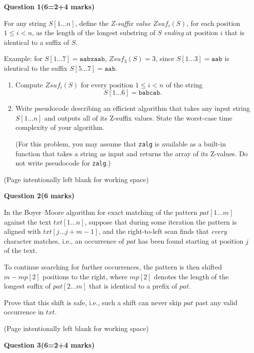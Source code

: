 \documentclass[12pt,letterpaper]{article}
\newcommand{\marksbox}[1]{%
  \vfill
  \begin{flushright}
    \fbox{\parbox[c][1.1cm][c]{1.3cm}{\centering #1}}
  \end{flushright}
}
\newcommand{\questiontitle}[2]{%
  \textbf{Question #1}\hfill\textbf{(#2 marks)}
}
\newcommand{\workingpage}{%
  \newpage
  \begin{center}
    (Page intentionally left blank for working space)
  \end{center}
}
\begin{document}
\newpage

\questiontitle{1}{6=2+4}

For any string $S[1 \ldots n]$, define the \emph{Z-suffix value}
$Zsuf_i(S)$, for each position $1 \leq i < n$, as the length of the longest
substring of $S$ \emph{ending} at position $i$ that is identical to a suffix
of $S$.

Example: for $S[1 \ldots 7] = \texttt{aabxaab}$, $Zsuf_3(S) = 3$, since
$S[1 \ldots 3] = \texttt{aab}$ is identical to the suffix
$S[5 \ldots 7] = \texttt{aab}$.

\begin{enumerate}
  \item[(i)] Compute $Zsuf_i(S)$ for every position $1 \leq i < n$ of the
  string
  \[
    S[1 \ldots 6] = \texttt{babcab}.
  \]

  \item[(ii)] Write pseudocode describing an efficient algorithm that takes
  any input string $S[1 \ldots n]$ and outputs all of its Z-suffix values.
  State the worst-case time complexity of your algorithm.

  (For this problem, you may assume that \texttt{zalg} is available as a
  built-in function that takes a string as input and returns the array of its
  Z-values. Do not write pseudocode for \texttt{zalg}.)
\end{enumerate}

\marksbox{6}

\workingpage
\newpage

\questiontitle{2}{6}

In the Boyer--Moore algorithm for exact matching of the pattern
$pat[1 \ldots m]$ against the text $txt[1 \ldots n]$, suppose that during some
iteration the pattern is aligned with $txt[j \ldots j+m-1]$, and the
right-to-left scan finds that \emph{every} character matches, i.e., an
occurrence of $pat$ has been found starting at position $j$ of the text.

To continue searching for further occurrences, the pattern is then shifted
$m - mp[2]$ positions to the right, where $mp[2]$ denotes the length of the
longest suffix of $pat[2 \ldots m]$ that is identical to a prefix of $pat$.

Prove that this shift is safe, i.e., such a shift can never skip $pat$ past
any valid occurrence in $txt$.

\marksbox{6}

\workingpage
\newpage

\questiontitle{3}{6=2+4}
\end{document}

